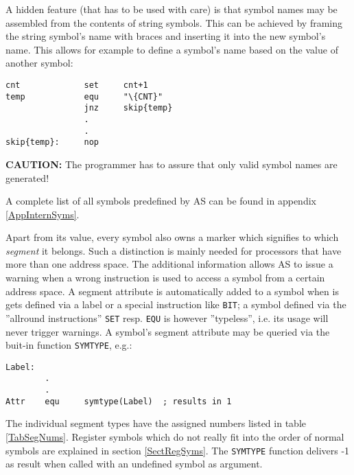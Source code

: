 \documentclass[12pt,twoside]{report}
\newcommand{\bb}[1]{{\bf #1}}
\newcommand{\tty}[1]{{\tt #1}}
\begin{document}
A hidden feature (that has to be used with care) is that symbol names
may be assembled from the contents of string symbols.  This can be
achieved by framing the string symbol's name with braces and
inserting it into the new symbol's name.  This allows for example to
define a symbol's name based on the value of another symbol:
\begin{verbatim}
cnt             set     cnt+1
temp            equ     "\{CNT}"
                jnz     skip{temp}
                .
                .
skip{temp}:     nop
\end{verbatim}
\bb{CAUTION:} The programmer has to assure that only valid symbol names
are generated!

A complete list of all symbols predefined by AS can be found in
appendix \ref{AppInternSyms}.

Apart from its value, every symbol also owns a marker which signifies to
which {\em segment} it belongs.  Such a distinction is mainly needed for
processors that have more than one address space.  The additional
information allows AS to issue a warning when a wrong instruction is used
to access a symbol from a certain address space.  A segment attribute is
automatically added to a symbol when is gets defined via a label or a
special instruction like \tty{BIT}; a symbol defined via the ''allround
instructions'' \tty{SET} resp. \tty{EQU} is however ''typeless'', i.e. its
usage will never trigger warnings.  A symbol's segment attribute may be
queried via the buit-in function \tty{SYMTYPE}, e.g.:
\begin{verbatim}
Label:
        .
        .
Attr    equ     symtype(Label)  ; results in 1
\end{verbatim}
The individual segment types have the assigned numbers listed in table
\ref{TabSegNums}.  Register symbols which do not really fit into the order
of normal symbols are explained in section \ref{SectRegSyms}.  The
\tty{SYMTYPE} function delivers -1 as result when called with an undefined
symbol as argument.
\end{document}
